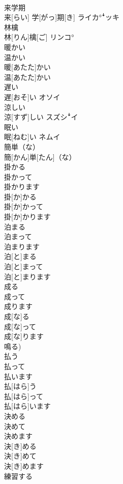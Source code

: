 \documentclass[8pt]{extreport}
\begin{document}
\begin{CJK}{UTF8}{min}
\\	来学期	
\\	来[らい] 学[がっ]期[き]	ライカ°ꜜッキ
\\	林檎	
\\	林[りん]檎[ご]	リンコ°
\\	暖かい 
\\	温かい	
\\	暖[あたた]かい 
\\	温[あたた]かい	
\\	遅い	
\\	遅[おそ]い	オソイ
\\	涼しい	
\\	涼[すず]しい	スズシꜜイ
\\	眠い	
\\	眠[ねむ]い	ネムイ
\\	簡単（な）	
\\	簡[かん]単[たん]（な）	
\\	掛かる 
\\	掛かって 
\\	掛かります	
\\	掛[か]かる 
\\	掛[か]かって 
\\	掛[か]かります	
\\	泊まる 
\\	泊まって 
\\	泊まります	
\\	泊[と]まる 
\\	泊[と]まって 
\\	泊[と]まります	
\\	成る 
\\	成って 
\\	成ります	
\\	成[な]る 
\\	成[な]って 
\\	成[な]ります 
\\	鳴る)	
\\	払う 
\\	払って 
\\	払います	
\\	払[はら]う 
\\	払[はら]って 
\\	払[はら]います	
\\	決める 
\\	決めて 
\\	決めます	
\\	決[き]める 
\\	決[き]めて 
\\	決[き]めます	
\\	練習する 

\end{CJK}
\end{document}
